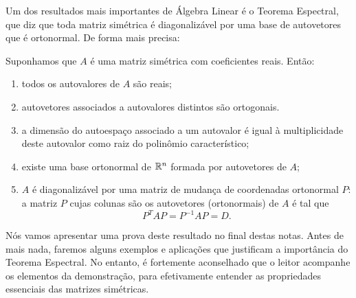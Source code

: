 \documentclass[../livro.tex]{subfiles}
\begin{document}
Um dos resultados mais importantes de Álgebra Linear é o Teorema Espectral, que diz que toda matriz simétrica é diagonalizável por uma base de autovetores que é ortonormal. De forma mais precisa:

\begin{teoespectral}
	Suponhamos que $A$ é uma matriz simétrica com coeficientes reais. Então:
	\begin{enumerate}[$(i)$]
		\item todos os autovalores de $A$ são reais;
		\item autovetores associados a autovalores distintos são ortogonais.
		\item a dimensão do autoespaço associado a um autovalor é igual à multiplicidade deste autovalor como raiz do polinômio característico;
		\item existe uma base ortonormal de $\mathbb{R}^n$ formada por autovetores de $A$;
		\item $A$ é diagonalizável por uma matriz de mudança de coordenadas ortonormal $P$: a matriz $P$ cujas colunas são os autovetores (ortonormais) de $A$ é tal que 
		\[
		P^{T} A P = P^{-1} A P = D.
		\]
	\end{enumerate}
\end{teoespectral}

Nós vamos apresentar uma prova deste resultado no final destas notas. Antes de mais nada, faremos alguns exemplos e aplicações que justificam a importância do Teorema Espectral. No entanto, é fortemente aconselhado que o leitor acompanhe os elementos da demonstração, para efetivamente entender as propriedades essenciais das matrizes simétricas.
\end{document}
